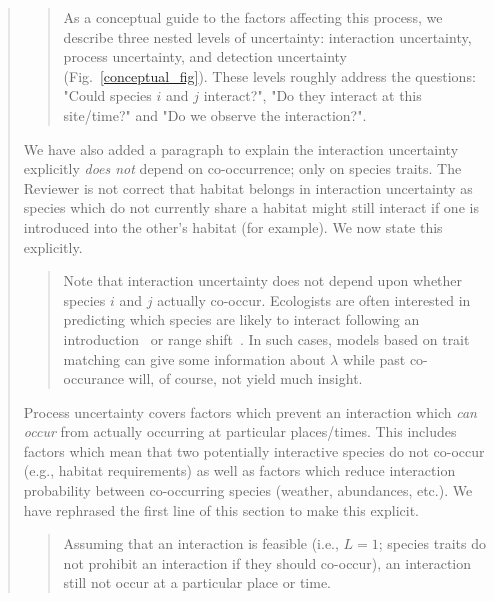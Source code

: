 \documentclass[12pt]{letter}
\begin{document}
\begin{quotation}
		\begin{quotation}

			As a conceptual guide to the factors affecting this process, we describe three nested levels of uncertainty: interaction uncertainty, process uncertainty, and detection uncertainty (Fig.~\ref{conceptual_fig}). These levels roughly address the questions: "Could species $i$ and $j$ interact?", "Do they interact at this site/time?" and "Do we observe the interaction?".

		\end{quotation}

	We have also added a paragraph to explain the interaction uncertainty explicitly \emph{does not} depend on co-occurrence; only on species traits. The Reviewer is not correct that habitat belongs in interaction uncertainty as species which do not currently share a habitat might still interact if one is introduced into the other's habitat (for example). We now state this explicitly.

		\begin{quotation}

			Note that interaction uncertainty does not depend upon whether species $i$ and $j$ actually co-occur. Ecologists are often interested in predicting which species are likely to interact following an introduction~\citep{} or range shift~\citep{}. In such cases, models based on trait matching can give some information about $\lambda$ while past co-occurance will, of course, not yield much insight.

		\end{quotation}

	Process uncertainty covers factors which prevent an interaction which \emph{can occur} from actually occurring at particular places/times. This includes factors which mean that two potentially interactive species do not co-occur (e.g., habitat requirements) as well as factors which reduce interaction probability between co-occurring species (weather, abundances, etc.). We have rephrased the first line of this section to make this explicit.

		\begin{quotation}
			
			Assuming that an interaction is feasible (i.e., $L=1$; species traits do not prohibit an interaction if they should co-occur), an interaction still not occur at a particular place or time. 

		\end{quotation}


\end{quotation}
\end{document}
